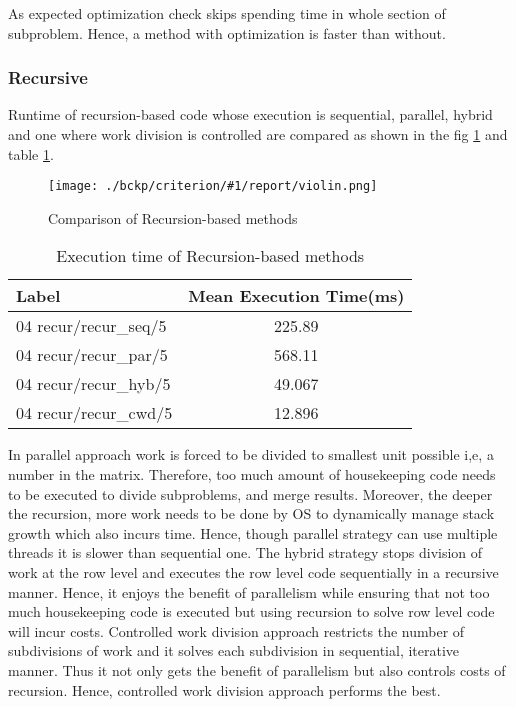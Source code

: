 \documentclass{article}
\newcommand{\loadGraph}[3]{{%
\begin{figure}[!ht]
    \texttt{[image: ./bckp/criterion/\#1/report/violin.png]}
    \caption{#3}
    \label{#2}
\end{figure}}
}%
\begin{document}
As expected optimization check skips spending time in whole section of subproblem.
Hence, a method with optimization is faster than without. 

\subsubsection{Recursive}
Runtime of recursion-based code whose execution is sequential, parallel, hybrid and one where work division is controlled are compared as shown in the fig \ref{04_recur} and table \ref{recur}.

\loadGraph{04 recur}{04_recur}{Comparison of Recursion-based methods}

\begin{table}[!ht]
\centering
\begin{tabular}{lc}    
\toprule
Label                 & Mean Execution Time(ms) \\ \midrule
04 recur/recur\_seq/5 & 225.89                  \\
04 recur/recur\_par/5 & 568.11                  \\
04 recur/recur\_hyb/5 & 49.067                  \\
04 recur/recur\_cwd/5 & 12.896                  \\ \bottomrule
\end{tabular}
\caption{Execution time of Recursion-based methods}
\label{recur}
\end{table}

In parallel approach work is forced to be divided to smallest unit possible i,e, a number in the matrix.
Therefore, too much amount of housekeeping code needs to be executed to divide subproblems, and merge results.
Moreover, the deeper the recursion, more work needs to be done by OS to dynamically manage stack growth which also incurs time.
Hence, though parallel strategy can use multiple threads it is slower than sequential one.
The hybrid strategy stops division of work at the row level and executes the row level code sequentially in a recursive manner.
Hence, it enjoys the benefit of parallelism while ensuring that not too much housekeeping code is executed but using recursion to solve row level code will incur costs.
Controlled work division approach restricts the number of subdivisions of work and it solves each subdivision in sequential, iterative manner.
Thus it not only gets the benefit of parallelism but also controls costs of recursion.
Hence, controlled work division approach performs the best.
\end{document}

